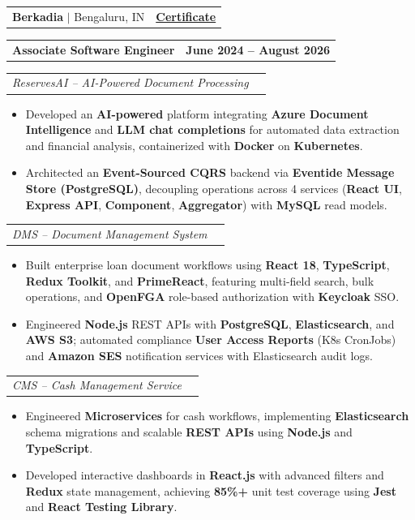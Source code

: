 \documentclass[letterpaper,10pt]{article}
\makeatletter
\newcommand{\resumeItem}[1]{
  \item\small{
    {#1 \vspace{-3pt}}
  }
}
\newcommand{\resumeProjectHeading}[2]{
    \item
    \begin{tabular*}{1.00\textwidth}[t]{l@{\extracolsep{\fill}}r}
      #1 & \textbf{\small #2}\\
    \end{tabular*}\vspace{-9pt}
}
\newcommand{\resumeItemListStart}{\begin{itemize}}
\newcommand{\resumeItemListEnd}{\end{itemize}\vspace{-7pt}}
\makeatother
\begin{document}
    \resumeProjectHeading
        {\textbf{Berkadia} $|$ Bengaluru, IN}
        {\href{https://drive.google.com/file/d/1yrVaOmV1J4laQjglxUJJJVH6zrVVLhhf/view}{\textbf{Certificate} \faExternalLink*}}
    \resumeProjectHeading
        {\textbf{Associate Software Engineer}}{June 2024 -- August 2026}
    \resumeProjectHeading
        {\textit{ReservesAI -- AI-Powered Document Processing}}{}
    \resumeItemListStart
        \resumeItem{Developed an \textbf{AI-powered} platform integrating \textbf{Azure Document Intelligence} and \textbf{LLM chat completions} for automated data extraction and financial analysis, containerized with \textbf{Docker} on \textbf{Kubernetes}.}
        \resumeItem{Architected an \textbf{Event-Sourced CQRS} backend via \textbf{Eventide Message Store (PostgreSQL)}, decoupling operations across 4 services (\textbf{React UI}, \textbf{Express API}, \textbf{Component}, \textbf{Aggregator}) with \textbf{MySQL} read models.}
    \resumeItemListEnd

    \resumeProjectHeading
        {\textit{DMS -- Document Management System}}{}
    \resumeItemListStart
        \resumeItem{Built enterprise loan document workflows using \textbf{React 18}, \textbf{TypeScript}, \textbf{Redux Toolkit}, and \textbf{PrimeReact}, featuring multi-field search, bulk operations, and \textbf{OpenFGA} role-based authorization with \textbf{Keycloak} SSO.}
        \resumeItem{Engineered \textbf{Node.js} REST APIs with \textbf{PostgreSQL}, \textbf{Elasticsearch}, and \textbf{AWS S3}; automated compliance \textbf{User Access Reports} (K8s CronJobs) and \textbf{Amazon SES} notification services with Elasticsearch audit logs.}
    \resumeItemListEnd

    \resumeProjectHeading
        {\textit{CMS -- Cash Management Service}}{}
    \resumeItemListStart
        \resumeItem{Engineered \textbf{Microservices} for cash workflows, implementing \textbf{Elasticsearch} schema migrations and scalable \textbf{REST APIs} using \textbf{Node.js} and \textbf{TypeScript}.}
        \resumeItem{Developed interactive dashboards in \textbf{React.js} with advanced filters and \textbf{Redux} state management, achieving \textbf{85\%+} unit test coverage using \textbf{Jest} and \textbf{React Testing Library}.}
    \resumeItemListEnd
\end{document}
